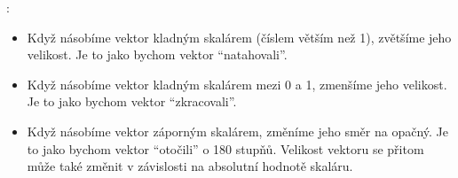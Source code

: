 \documentclass[letterpaper,10pt,english]{jupyterBook}
\begin{document}
\sphinxAtStartPar
{}:
\begin{itemize}
\item {} 
\sphinxAtStartPar
{} Když násobíme vektor kladným skalárem (číslem větším než 1), zvětšíme jeho velikost. Je to jako bychom vektor “natahovali”.

\item {} 
\sphinxAtStartPar
{} Když násobíme vektor kladným skalárem mezi 0 a 1, zmenšíme jeho velikost. Je to jako bychom vektor “zkracovali”.

\item {} 
\sphinxAtStartPar
{} Když násobíme vektor záporným skalárem, změníme jeho směr na opačný. Je to jako bychom vektor “otočili” o 180 stupňů. Velikost vektoru se přitom může také změnit v závislosti na absolutní hodnotě skaláru.

\end{itemize}
\end{document}
